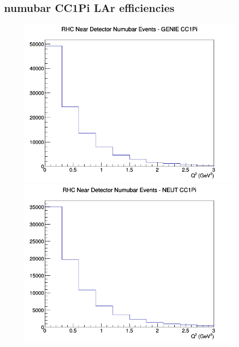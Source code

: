 \subsection{numubar CC1Pi LAr efficiencies}
\begin{figure}[h]
\includegraphics[width=\linewidth]{eff_Q2/LAr/CC1Pi_RHC_ND_numubar_Q2_GENIE.png}
\endminipage
{}
\includegraphics[width=\linewidth]{eff_Q2/LAr/CC1Pi_RHC_ND_numubar_Q2_NEUT.png}
\endminipage
{}

\end{figure}
